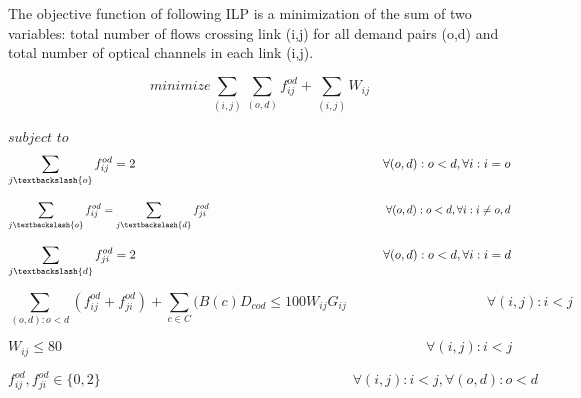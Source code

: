 The objective function of following ILP is a minimization of the sum of two variables: total number of flows crossing link (i,j) for all demand pairs (o,d) and total number of optical channels in each link (i,j).
\vspace{11pt}

\begin{equation}
minimize    \sum_{(i,j)} \sum_{(o,d)} f_{ij}^{od} + \sum_{(i,j)} W_{ij}
\label{ILPOpaque}
\end{equation}

\newpage
$subject$ $to$
\begin{equation}
\sum_{j\textbackslash \{o\}} f_{ij}^{od} = 2  \qquad \qquad \qquad \qquad \qquad \qquad \qquad \qquad \qquad \qquad
\forall(o,d) : o < d, \forall i: i = o
\label{ILPOpaque1}
\end{equation}

\vspace{-5pt}
\begin{equation}
\sum_{j\textbackslash \{o\}} f_{ij}^{od} = \sum_{j\textbackslash \{d\}} f_{ji}^{od}   \qquad \qquad \qquad \qquad \qquad \qquad \qquad \qquad
\forall(o,d) : o < d, \forall i: i \neq o,d
\label{ILPOpaque2}
\end{equation}

\begin{equation}
\sum_{j\textbackslash \{d\}} f_{ji}^{od} = 2  \qquad \qquad \qquad \qquad \qquad \qquad \qquad \qquad \qquad \qquad
\forall(o,d) : o < d, \forall i: i = d
\label{ILPOpaque3}
\end{equation}

\begin{equation}
\sum_{(o,d):o<d} \left(f_{ij}^{od} + f_{ji}^{od}\right) + \sum_{c\in C} (B\left(c\right) D_{cod}\leq100 W_{ij} G_{ij} \qquad \qquad \qquad \qquad \qquad
\forall(i,j) : i < j
\label{ILPOpaque4}
\end{equation}

\begin{equation}
W_{ij} \leq 80 \qquad  \qquad \qquad \qquad \qquad \qquad \qquad \qquad \qquad \qquad \qquad \qquad \qquad \forall(i,j) : i < j
\label{ILPOpaque5}
\end{equation}

\begin{equation}
f_{ij}^{od} , f_{ji}^{od} \in \{0,2\}   \qquad \qquad \qquad \qquad \qquad \qquad \qquad \qquad \qquad
\forall(i,j) : i < j, \forall(o,d) : o < d
\label{ILPOpaque6}
\end{equation}

